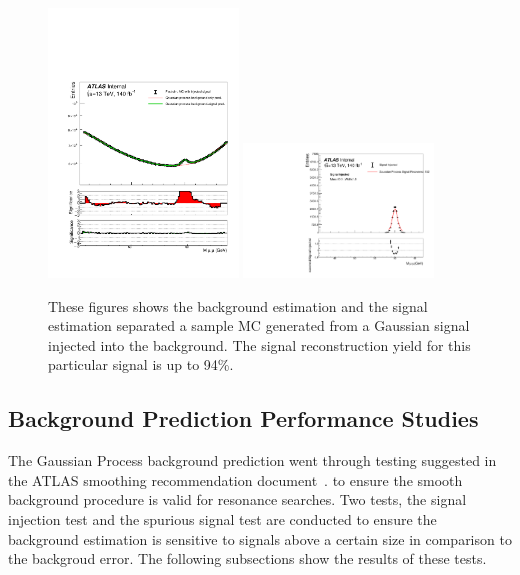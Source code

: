 \begin{figure}[!htb]
    \begin{center}
        \includegraphics[width=0.45\textwidth]{figures/chapter_dimuon//BackgroundSeparated}        
        \includegraphics[width=0.45\textwidth]{figures/chapter_dimuon/SignalSeparated}        
        \caption{
            These figures shows the background estimation and the signal estimation separated a sample MC generated from a Gaussian signal injected into the background. The signal reconstruction yield for this particular signal is up to 94\%.
        }
        \label{fig:signalseparation}
    \end{center}
\end{figure}
\FloatBarrier


\subsection{Background Prediction Performance Studies}
The Gaussian Process background prediction went through testing suggested in the ATLAS smoothing recommendation document~\cite{ATL-PHYS-PUB-2020-028}. to ensure the smooth background procedure is valid for resonance searches. Two tests, the signal injection test and the spurious signal test are conducted to ensure the background estimation is sensitive to signals above a certain size in comparison to the backgroud error. The following subsections show the results of these tests.

